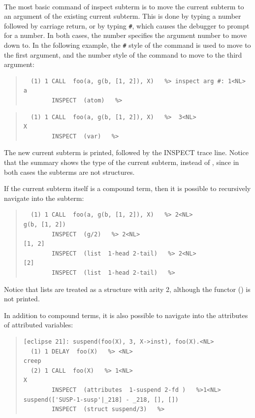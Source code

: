 \begin{descr}{1cm}


\\
The most basic command of inspect subterm is to move the current subterm to
an argument of the existing current subterm. This is done by typing a
number followed by carriage return, or by typing  \verb:#:, which causes the
debugger to prompt for a number. In both cases, the number specifies the
argument number to move down to.
In the following example, the \verb:#: style of the command is used to move
to the first argument, and the number style of the command to move to the
third argument:

\begin{quote}
\begin{verbatim}
  (1) 1 CALL  foo(a, g(b, [1, 2]), X)   %> inspect arg #: 1<NL>
a
        INSPECT  (atom)   %>
\end{verbatim}
\end{quote}

\begin{quote}
\begin{verbatim}
  (1) 1 CALL  foo(a, g(b, [1, 2]), X)   %>  3<NL>
X
        INSPECT  (var)   %>
\end{verbatim}
\end{quote}

The new current subterm is printed, followed by the INSPECT
trace line. Notice that the summary shows the type of the current
subterm, instead of , since in both cases the subterms are
not structures.

If the current subterm itself is a compound term, then it is possible to
recursively navigate into the subterm:

\begin{quote}
\begin{verbatim}
  (1) 1 CALL  foo(a, g(b, [1, 2]), X)   %> 2<NL>
g(b, [1, 2])
        INSPECT  (g/2)   %> 2<NL>
[1, 2]
        INSPECT  (list  1-head 2-tail)   %> 2<NL>
[2]
        INSPECT  (list  1-head 2-tail)   %>
\end{verbatim}
\end{quote}

Notice that lists are treated as a structure with arity 2, although the
functor () is not printed.

In addition to compound terms, it is also possible to navigate into the
attributes of attributed variables:

\begin{quote}
\begin{verbatim}
[eclipse 21]: suspend(foo(X), 3, X->inst), foo(X).<NL>
  (1) 1 DELAY  foo(X)   %> <NL>
creep
  (2) 1 CALL  foo(X)   %> 1<NL>
X
        INSPECT  (attributes  1-suspend 2-fd )   %>1<NL>
suspend(['SUSP-1-susp'|_218] - _218, [], [])
        INSPECT  (struct suspend/3)   %>
\end{verbatim}
\end{quote}


\end{descr}
